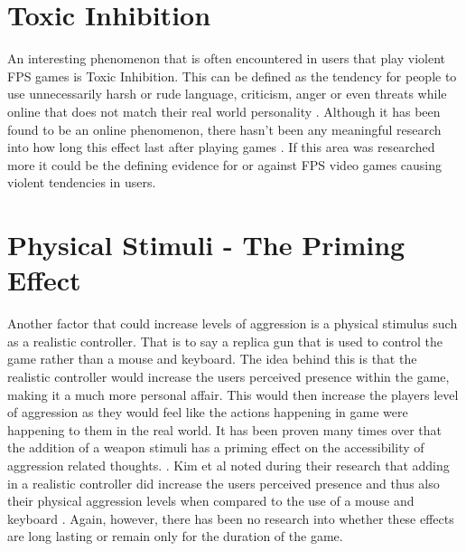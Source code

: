 \documentclass{scrartcl}
\begin{document}
\section{Toxic Inhibition}
An interesting phenomenon that is often encountered in users that play violent FPS games is Toxic Inhibition. This can be defined as the tendency for people to use unnecessarily harsh or rude language, criticism, anger or even threats while online that does not match their real world personality \cite{rawn2008examining}. Although it has been found to be an online phenomenon, there hasn't been any meaningful research into how long this effect last after playing games \cite{rawn2008examining}. If this area was researched more it could be the defining evidence for or against FPS video games causing violent tendencies in users.

\section{Physical Stimuli - The Priming Effect}
Another factor that could increase levels of aggression is a physical stimulus such as a realistic controller. That is to say a replica gun that is used to control the game rather than a mouse and keyboard. The idea behind this is that the realistic controller would increase the users perceived presence within the game, making it a much more personal affair. This would then increase the players level of aggression as they would feel like the actions happening in game were happening to them in the real world. It has been proven many times over that the addition of a weapon stimuli has a priming effect on the accessibility of aggression related thoughts. \cite{kim2011effects}. Kim et al noted during their research that adding in a realistic controller did increase the users perceived presence and thus also their physical aggression levels when compared to the use of a mouse and keyboard \cite {kim2011effects}. Again, however, there has been no research into whether these effects are long lasting or remain only for the duration of the game.
\end{document}

